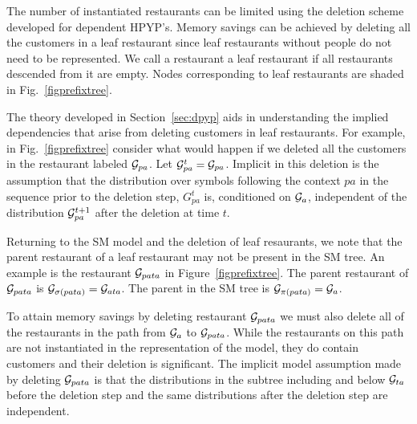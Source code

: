 The number of instantiated restaurants can be limited using the deletion scheme developed for dependent HPYP's. Memory savings can be achieved by deleting all the customers in a leaf restaurant since leaf restaurants without people do not need to be represented. We call a restaurant a leaf restaurant if all restaurants descended from it are empty. Nodes corresponding to leaf restaurants are shaded in Fig.~\ref{figprefixtree}.

The theory developed in Section~\ref{sec:dpyp} aids in understanding the implied dependencies that arise from deleting customers in leaf restaurants. For example, in Fig.~\ref{figprefixtree} consider what would happen if we deleted all the customers in the restaurant labeled $\G_{pa}$. Let $\G^t_{pa} = \G_{pa}$.  Implicit in this deletion is the assumption that the distribution over symbols following the context $pa$ in the sequence prior to the deletion step, $G_{pa}^t$  is, conditioned on  $\G_a$, independent of the distribution $\G_{pa}^{t+1}$ after the deletion at time $t$.


Returning to the SM model and the deletion of leaf resaurants, we note that the parent restaurant of a leaf restaurant may not be present in the SM tree.  An example is the restaurant $\G_{pata}$ in Figure~\ref{figprefixtree}. The parent restaurant of $\G_{pata}$ is $\G_{\sigma(pata)} = \G_{ata}$.  The parent in the SM tree is $\G_{\pi(pata)} = \G_a$. 

To attain memory savings by deleting restaurant $\G_{pata}$ we must also delete all of the restaurants in the path from $\G_a$ to $\G_{pata}$.  While the restaurants on this path are not instantiated in the representation of the model, they do contain customers and their deletion is significant.  The implicit model assumption made by deleting $\G_{pata}$ is that the distributions in the subtree including and below $\G_{ta}$ before the deletion step and the same distributions after the deletion step are independent.

